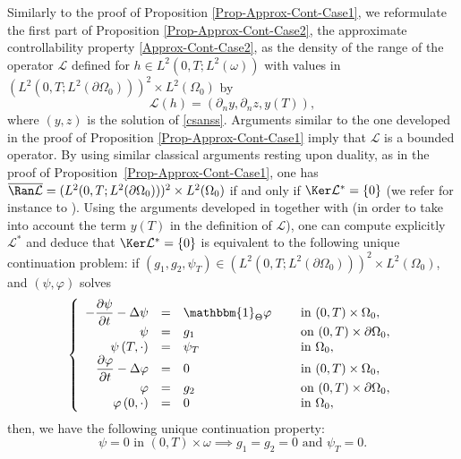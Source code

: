 Similarly to the proof of Proposition \ref{Prop-Approx-Cont-Case1}, we reformulate the first part of Proposition \ref{Prop-Approx-Cont-Case2}, \ie the approximate controllability property \eqref{Approx-Cont-Case2}, as the density of the range of the operator $\mathcal{L}$ defined for $h \in L^2(0,T; L^2(\omega))$ with values in $(L^2(0,T; L^2(\partial \Omega_0)))^2 \times L^2(\Omega_0)$ by
\[
\mathcal{L} (h) = (\partial_n y, \partial_n z, y(T)),
\]
where $(y,z)$ is the solution of \eqref{csanss}. Arguments similar to the one developed in the proof of Proposition \ref{Prop-Approx-Cont-Case1} imply that $\mathcal L$ is a bounded operator.
By using similar classical arguments resting upon duality, as in the proof of Proposition~\ref{Prop-Approx-Cont-Case1}, one has $\overline{\Ran \mathcal{L}} = (L^2(0,T; L^2(\partial \Omega_0)))^2 \times L^2(\Omega_0)$ if and only if $\Ker \mathcal{L}^* = \{0\}$ (we refer for instance to \cite[Cor.\,2.18]{Brezis}). Using the arguments developed in \cite[Prop.\,2.1]{Lissy-Privat-Simpore} together with \cite[Th.\,2.43, p.\,56]{CNL} (in order to take into account the term $y(T)$ in the definition of $\mathcal L$), one can compute explicitly $\mathcal L^*$ and deduce that $\Ker\mathcal{L}^* = \{0\}$ is equivalent to the following unique continuation problem: if $(g_1, g_2, \psi_T) \in (L^2(0,T; L^2(\partial\Omega_0)))^2\times L^2(\Omega_0)$, and $(\psi, \varphi)$ solves
\begin{equation}
\label{Coupled-Heat-Approx-Adj-Case2}
\left\{
\begin{array}{rcll}
- \dfrac{\partial \psi}{\partial t}-\Delta \psi &=&\mathbbm{1}_{\Theta}\varphi \quad&\text{ in }(0,T) \times \Omega_0,
\\
\psi &=& g_1 &\text{ on }(0,T) \times \partial \Omega_0,
\\
\psi \left(T,\cdot\right) &=& \psi_T &\text{ in }\Omega_0,
\\
\dfrac{\partial \varphi}{\partial t}-\Delta \varphi &=& 0 &\text{ in }(0,T) \times \Omega_0,
\\
\varphi &=& g_2 &\text{ on }(0,T) \times \partial \Omega_0,
\\
\varphi\left(0,\cdot\right) &=&0 &\text{ in }\Omega_0,
\end{array}
\right.
\end{equation}
then, we have the following unique continuation property:
\begin{equation}
\label{UC-Adj-Coupled-Case2}
\psi = 0 \text{ in } (0,T) \times \omega \implies g_1 =g_2 = 0 \text{ and } \psi_T = 0.
\end{equation}

